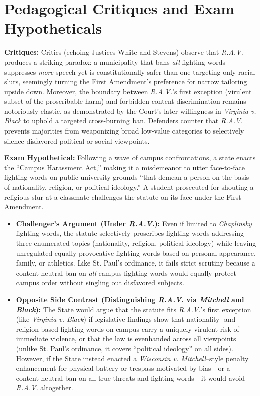 \documentclass[12pt]{article}
\begin{document}
\begin{itemize}
\end{itemize}

\section{Pedagogical Critiques and Exam Hypotheticals}
\textbf{Critiques:} Critics (echoing Justices White and Stevens) observe that \textit{R.A.V.} produces a striking paradox: a municipality that bans \textit{all} fighting words suppresses \textit{more} speech yet is constitutionally safer than one targeting only racial slurs, seemingly turning the First Amendment's preference for narrow tailoring upside down. Moreover, the boundary between \textit{R.A.V.}'s first exception (virulent subset of the proscribable harm) and forbidden content discrimination remains notoriously elastic, as demonstrated by the Court's later willingness in \textit{Virginia v. Black} to uphold a targeted cross-burning ban. Defenders counter that \textit{R.A.V.} prevents majorities from weaponizing broad low-value categories to selectively silence disfavored political or social viewpoints.

\textbf{Exam Hypothetical:} Following a wave of campus confrontations, a state enacts the ``Campus Harassment Act,'' making it a misdemeanor to utter face-to-face fighting words on public university grounds ``that demean a person on the basis of nationality, religion, or political ideology.'' A student prosecuted for shouting a religious slur at a classmate challenges the statute on its face under the First Amendment.
\begin{itemize}
  \item \textbf{Challenger's Argument (Under \textit{R.A.V.}):} Even if limited to \textit{Chaplinsky} fighting words, the statute selectively proscribes fighting words addressing three enumerated topics (nationality, religion, political ideology) while leaving unregulated equally provocative fighting words based on personal appearance, family, or athletics. Like St. Paul's ordinance, it fails strict scrutiny because a content-neutral ban on \textit{all} campus fighting words would equally protect campus order without singling out disfavored subjects.
  \item \textbf{Opposite Side Contrast (Distinguishing \textit{R.A.V.} via \textit{Mitchell} and \textit{Black}):} The State would argue that the statute fits \textit{R.A.V.}'s first exception (like \textit{Virginia v. Black}) if legislative findings show that nationality- and religion-based fighting words on campus carry a uniquely virulent risk of immediate violence, or that the law is evenhanded across all viewpoints (unlike St. Paul's ordinance, it covers ``political ideology'' on all sides). However, if the State instead enacted a \textit{Wisconsin v. Mitchell}--style penalty enhancement for physical battery or trespass motivated by bias---or a content-neutral ban on all true threats and fighting words---it would avoid \textit{R.A.V.} altogether.
\end{itemize}
\end{document}
